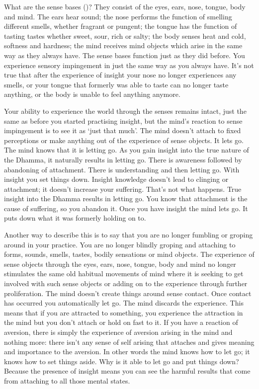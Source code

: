 What are the sense bases ()? They consist of the eyes, ears, nose, tongue, body and mind. The ears hear sound; the nose performs the function of smelling different smells, whether fragrant or pungent; the tongue has the function of tasting tastes whether sweet, sour, rich or salty; the body senses heat and cold, softness and hardness; the mind receives mind objects which arise in the same way as they always have. The sense bases function just as they did before. You experience sensory impingement in just the same way as you always have. It's not true that after the experience of insight your nose no longer experiences any smells, or your tongue that formerly was able to taste can no longer taste anything, or the body is unable to feel anything anymore.

Your ability to experience the world through the senses remains intact, just the same as before you started practising insight, but the mind's reaction to sense impingement is to see it as `just that much'. The mind doesn't attach to fixed perceptions or make anything out of the experience of sense objects. It lets go. The mind knows that it is letting go. As you gain insight into the true nature of the Dhamma, it naturally results in letting go. There is awareness followed by abandoning of attachment. There is understanding and then letting go. With insight you set things down. Insight knowledge doesn't lead to clinging or attachment; it doesn't increase your suffering. That's not what happens. True insight into the Dhamma results in letting go. You know that attachment is the cause of suffering, so you abandon it. Once you have insight the mind lets go. It puts down what it was formerly holding on to.

Another way to describe this is to say that you are no longer fumbling or groping around in your practice. You are no longer blindly groping and attaching to forms, sounds, smells, tastes, bodily sensations or mind objects. The experience of sense objects through the eyes, ears, nose, tongue, body and mind no longer stimulates the same old habitual movements of mind where it is seeking to get involved with such sense objects or adding on to the experience through further proliferation. The mind doesn't create things around sense contact. Once contact has occurred you automatically let go. The mind discards the experience. This means that if you are attracted to something, you experience the attraction in the mind but you don't attach or hold on fast to it. If you have a reaction of aversion, there is simply the experience of aversion arising in the mind and nothing more: there isn't any sense of self arising that attaches and gives meaning and importance to the aversion. In other words the mind knows how to let go; it knows how to set things aside. Why is it able to let go and put things down? Because the presence of insight means you can see the harmful results that come from attaching to all those mental states.

